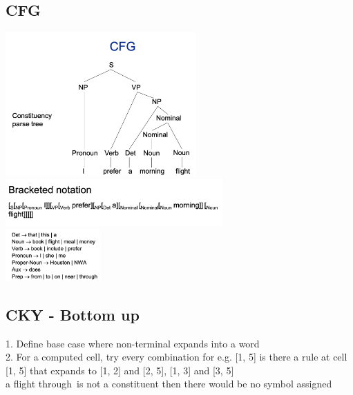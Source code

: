 \documentclass[11pt]{article}
\begin{document}
\begin{multicols*}{3}
\subsection*{CFG}
\includegraphics[height=5.5cm]{images/w4}\\
\includegraphics[height=1.8cm]{images/w5}\\
\includegraphics[height=2cm]{images/w6}
\subsection*{CKY - Bottom up}
1. Define base case where non-terminal expands into a word\\
2. For a computed cell, try every combination for e.g. [1, 5] is there a rule at cell [1, 5] that expands to [1, 2] and [2, 5], [1, 3] and [3, 5]\\
\textquotesingle a flight through\textquotesingle\ is not a constituent then there would be no symbol assigned

\end{multicols*}
\end{document}
